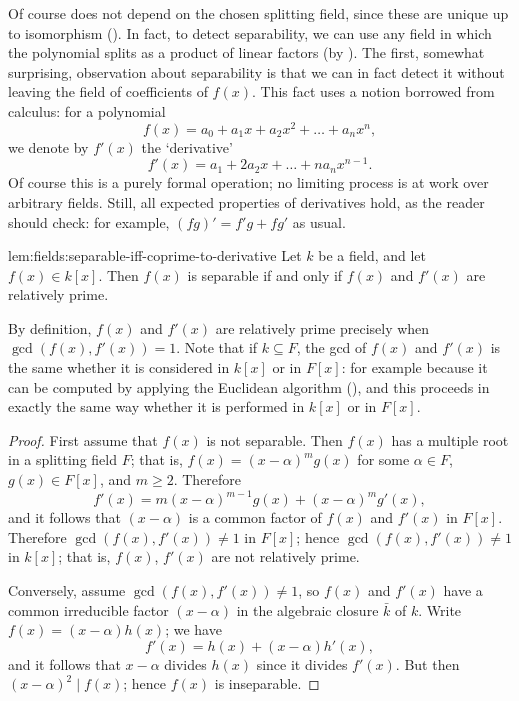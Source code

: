 Of course  does not depend on the chosen
splitting field, since these are unique up to isomorphism
().  In fact, to detect separability, we can use
any field in which the polynomial splits as a product of linear
factors (by
). The
first, somewhat surprising, observation about separability is that we
can in fact detect it without leaving the field of coefficients of
$f(x)$. This fact uses a notion borrowed from calculus: for a
polynomial
\[
  f(x) = a_0 + a_1 x + a_2 x^2 + \dots + a_n x^n,
\]
we denote by $f'(x)$ the `derivative'
\[
  f'(x) = a_1 + 2a_2 x + \dots + na_n x^{n-1}.
\]
Of course this is a purely formal operation; no limiting process is at
work over arbitrary fields. Still, all expected properties of
derivatives hold, as the reader should check: for example,
$(fg)' = f'g + fg'$ as usual.
\begin{lem}{}{lem:fields:separable-iff-coprime-to-derivative}
  Let $k$ be a field, and let $f(x) \in k[x]$. Then $f(x)$ is
  separable if and only if $f(x)$ and $f'(x)$ are relatively prime.
\end{lem}
By definition, $f(x)$ and $f'(x)$ are relatively prime precisely when
$\gcd(f(x), f'(x)) = 1$. Note that if $k \subseteq F$, the gcd of
$f(x)$ and $f'(x)$ is the same whether it is considered in $k[x]$ or
in $F[x]$: for example because it can be computed by applying the
Euclidean algorithm
(), and this
proceeds in exactly the same way whether it is performed in $k[x]$ or
in $F[x]$.
\begin{proof}
  First assume that $f(x)$ is not separable. Then $f(x)$ has a
  multiple root in a splitting field $F$; that is,
  $f(x) = {(x - \alpha)}^m g(x)$ for some $\alpha \in F$,
  $g(x) \in F[x]$, and $m \geq 2$. Therefore
  \[
    f'(x) = m{(x-\alpha)}^{m-1}g(x) + {(x-\alpha)}^m g'(x),
  \]
  and it follows that $(x - \alpha)$ is a common factor of $f(x)$ and
  $f'(x)$ in $F[x]$. Therefore $\gcd(f(x), f'(x)) \neq 1$ in $F[x]$;
  hence $\gcd(f(x), f'(x)) \neq 1$ in $k[x]$; that is, $f(x)$, $f'(x)$
  are not relatively prime.

  Conversely, assume $\gcd(f(x), f'(x)) \neq 1$, so $f(x)$ and $f'(x)$
  have a common irreducible factor $(x - \alpha)$ in the algebraic
  closure $\bar{k}$ of $k$. Write $f(x) = (x - \alpha)h(x)$; we have
  \[
    f'(x) = h(x) + (x-\alpha)h'(x),
  \]
  and it follows that $x - \alpha$ divides $h(x)$ since it divides
  $f'(x)$. But then ${(x-\alpha)}^2 \mid f(x)$; hence $f(x)$ is
  inseparable.
\end{proof}
